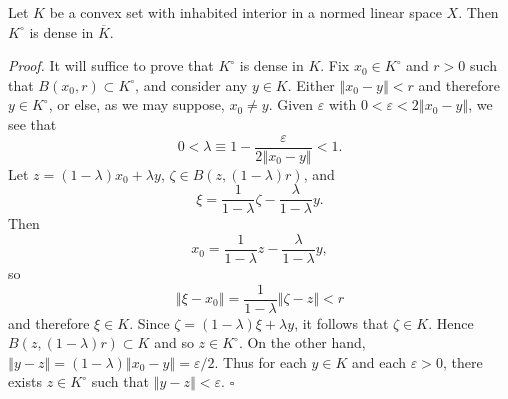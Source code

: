 \documentclass[10pt,a4paper]{amsart}
\newenvironment{proof}[1][Proof]{\noindent\textit{#1.} }{}
\begin{document}
\begin{proposition}
\label{oct06p1}Let $K$ be a convex set with inhabited interior in a normed
linear space $X$. Then $K^{\circ}$ is dense in $\overline{K}$.
\end{proposition}

\begin{proof}
It will suffice to prove that $K^{\circ}$ is dense in $K$. Fix $x_{0}\in
K^{\circ}$ and $r>0$ such that $B(x_{0},r)\subset K^{\circ}$, and consider any
$y\in K$. Either $\left\Vert x_{0}-y\right\Vert <r$ and therefore $y\in
K^{\circ}$, or else, as we may suppose, $x_{0}\neq y$. Given $\varepsilon$
with $0<\varepsilon<2\left\Vert x_{0}-y\right\Vert $, we see that%
\[
0<\lambda\equiv1-\frac{\varepsilon}{2\left\Vert x_{0}-y\right\Vert }<1\text{.}%
\]
Let $z=(1-\lambda)x_{0}+\lambda y$, $\zeta\in B(z,\left(  1-\lambda\right)
r)$, and%
\[
\xi=\frac{1}{1-\lambda}\zeta-\frac{\lambda}{1-\lambda}y.
\]
Then%
\[
x_{0}=\frac{1}{1-\lambda}z-\frac{\lambda}{1-\lambda}y,
\]
so%
\[
\left\Vert \xi-x_{0}\right\Vert =\frac{1}{1-\lambda}\left\Vert \zeta
-z\right\Vert <r
\]
and therefore $\xi\in K$. Since $\zeta=(1-\lambda)\xi+\lambda y$, it follows
that $\zeta\in K$. Hence $B(z,(1-\lambda)r)\subset K$ and so $z\in K^{\circ}$.
On the other hand, $\left\Vert y-z\right\Vert =\left(  1-\lambda\right)
\left\Vert x_{0}-y\right\Vert =\varepsilon/2$. Thus for each $y\in K$ and each
$\varepsilon>0$, there exists $z\in K^{\circ}$ such that $\left\Vert
y-z\right\Vert <\varepsilon$.%
\hfill
$\square$
\end{proof}
\end{document}
